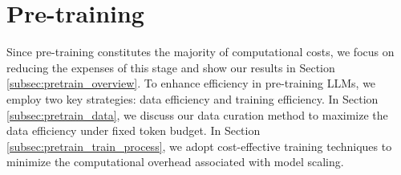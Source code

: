 \section{Pre-training}

Since pre-training constitutes the majority of computational costs, we focus on reducing the expenses of this stage and show our results in Section \ref{subsec:pretrain_overview}.
To enhance efficiency in pre-training LLMs, we employ two key strategies: data efficiency and training efficiency.
In Section \ref{subsec:pretrain_data}, we discuss our data curation method to maximize the data efficiency under fixed token budget.
In Section \ref{subsec:pretrain_train_process}, we adopt cost-effective training techniques to minimize the computational overhead associated with model scaling.






